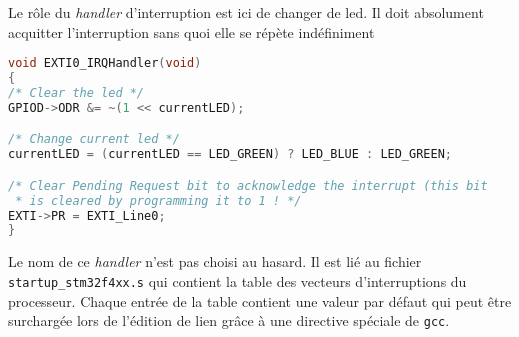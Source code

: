 \documentclass[12pt]{article}
\begin{document}
Le rôle du \emph{handler} d'interruption est ici de changer de led. Il doit absolument acquitter l'interruption sans quoi elle se répète indéfiniment 

\begin{lstlisting}[language=C]
void EXTI0_IRQHandler(void)
{
/* Clear the led */
GPIOD->ODR &= ~(1 << currentLED);

/* Change current led */
currentLED = (currentLED == LED_GREEN) ? LED_BLUE : LED_GREEN;

/* Clear Pending Request bit to acknowledge the interrupt (this bit 
 * is cleared by programming it to 1 ! */
EXTI->PR = EXTI_Line0;
}
\end{lstlisting}

Le nom de ce \emph{handler} n'est pas choisi au hasard. Il est lié au fichier \texttt{startup\_stm32f4xx.s} qui contient la table des vecteurs d'interruptions du processeur. Chaque entrée de la table contient une valeur par défaut qui peut être surchargée lors de l'édition de lien grâce à une directive spéciale de \texttt{gcc}.



\end{document}
